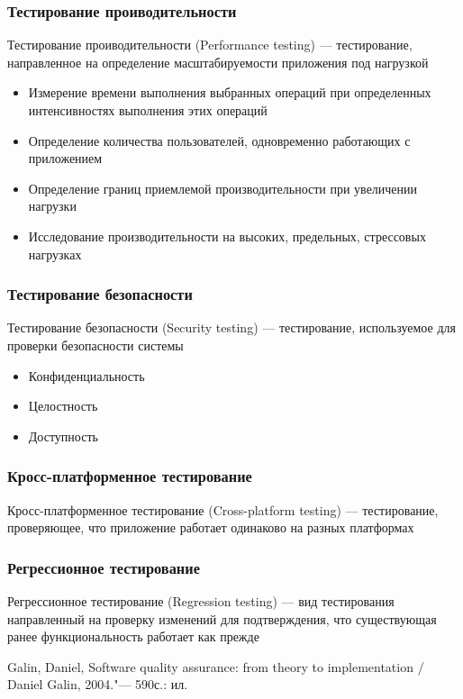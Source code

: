 \documentclass{../industrial-development}
\begin{document}
	\begin{frame} \frametitle{Тестирование проиводительности}
		\begin{block}{}
			\alert{Тестирование проиводительности (Performance testing)} --- тестирование, направленное на определение масштабируемости приложения под нагрузкой
		\end{block}
		\begin{itemize}
			\item Измерение времени выполнения выбранных операций при определенных интенсивностях выполнения этих операций
			\item Определение количества пользователей, одновременно работающих с приложением
			\item Определение границ приемлемой производительности при увеличении нагрузки
			\item Исследование производительности на высоких, предельных, стрессовых нагрузках
		\end{itemize}
	\end{frame}
	
	\begin{frame} \frametitle{Тестирование безопасности}
		\begin{block}{}
			\alert{Тестирование безопасности (Security testing)} --- тестирование, используемое для проверки безопасности системы
		\end{block}
		\begin{itemize}
			\item Конфиденциальность
			\item Целостность
			\item Доступность
		\end{itemize}
	\end{frame}
	
	\begin{frame} \frametitle{Кросс-платформенное тестирование}
		\begin{block}{}
			\alert{Кросс-платформенное тестирование (Cross-platform testing)} --- тестирование, проверяющее, что приложение работает одинаково на разных платформах
		\end{block}
	\end{frame}
	
	\begin{frame} \frametitle{Регрессионное тестирование}
		\begin{block}{}
			\alert {Регрессионное тестирование (Regression testing)} --- вид тестирования направленный на проверку изменений для подтверждения, что существующая ранее функциональность работает как прежде
		\end{block}
	\end{frame}
	
	\begin{thebibliography}{99}
		 Galin, Daniel, Software quality assurance: from theory to implementation / Daniel Galin, 2004."--- 590с.: ил.
	\end{thebibliography}
	
\end{document}
